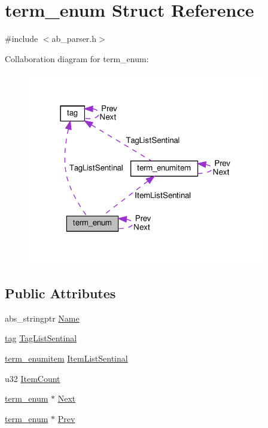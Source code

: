 \hypertarget{structterm__enum}{}\section{term\+\_\+enum Struct Reference}
\label{structterm__enum}


{\ttfamily \#include $<$ab\+\_\+parser.\+h$>$}



Collaboration diagram for term\+\_\+enum\+:
\nopagebreak
\begin{figure}[H]
\begin{center}
\leavevmode
\includegraphics[width=294pt]{d6/d82/structterm__enum__coll__graph}
\end{center}
\end{figure}
\subsection*{Public Attributes}
\begin{DoxyCompactItemize}
\item 
abs\+\_\+stringptr \hyperlink{structterm__enum_a41929255cd1231f08655f7440bd2051f}{Name}
\item 
\hyperlink{structtag}{tag} \hyperlink{structterm__enum_a064766a8666ff84a4571dff4d9a7070a}{Tag\+List\+Sentinal}
\item 
\hyperlink{structterm__enumitem}{term\+\_\+enumitem} \hyperlink{structterm__enum_a982f44fe4692493e3456a80b50805d64}{Item\+List\+Sentinal}
\item 
u32 \hyperlink{structterm__enum_a90cb3e473c1ca0a59037e3882af7a1bc}{Item\+Count}
\item 
\hyperlink{structterm__enum}{term\+\_\+enum} $\ast$ \hyperlink{structterm__enum_aa66270184b4f4d6457dda0afd18e25fc}{Next}
\item 
\hyperlink{structterm__enum}{term\+\_\+enum} $\ast$ \hyperlink{structterm__enum_addad4748b3a035a56ed83b5389668f35}{Prev}
\end{DoxyCompactItemize}


